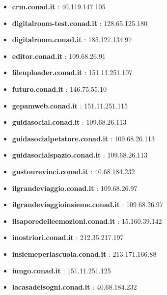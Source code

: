 \documentclass{article}
\begin{document}
\begin{itemize}
        \item \textbf{ crm.conad.it }: 40.119.147.105
    
        \item \textbf{ digitalroom-test.conad.it }: 128.65.125.180
    
        \item \textbf{ digitalroom.conad.it }: 185.127.134.97
    
        \item \textbf{ editor.conad.it }: 109.68.26.91
    
        \item \textbf{ fileuploader.conad.it }: 151.11.251.107
    
        \item \textbf{ futuro.conad.it }: 146.75.55.10
    
        \item \textbf{ gepamweb.conad.it }: 151.11.251.115
    
        \item \textbf{ guidasocial.conad.it }: 109.68.26.113
    
        \item \textbf{ guidasocialpetstore.conad.it }: 109.68.26.113
    
        \item \textbf{ guidasocialspazio.conad.it }: 109.68.26.113
    
        \item \textbf{ gustourevinci.conad.it }: 40.68.184.232
    
        \item \textbf{ ilgrandeviaggio.conad.it }: 109.68.26.97
    
        \item \textbf{ ilgrandeviaggioinsieme.conad.it }: 109.68.26.97
    
        \item \textbf{ ilsaporedelleemozioni.conad.it }: 15.160.39.142
    
        \item \textbf{ inostriori.conad.it }: 212.35.217.197
    
        \item \textbf{ insiemeperlascuola.conad.it }: 213.171.166.88
    
        \item \textbf{ iungo.conad.it }: 151.11.251.125
    
        \item \textbf{ lacasadeisogni.conad.it }: 40.68.184.232
    

\end{itemize}
\end{document}
